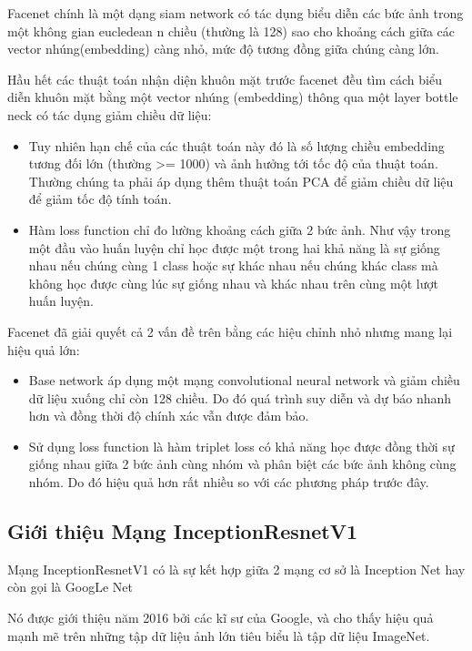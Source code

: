 Facenet chính là một dạng siam network có tác dụng biểu diễn các bức ảnh trong một không
gian eucledean n chiều (thường là 128) sao cho khoảng cách giữa các vector nhúng(embedding)
càng nhỏ, mức độ tương đồng giữa chúng càng lớn.

Hầu hết các thuật toán nhận diện khuôn mặt trước facenet đều tìm cách biểu diễn
khuôn mặt bằng một vector nhúng (embedding) thông qua một layer bottle neck có tác dụng
giảm chiều dữ liệu:

\begin{itemize}
    \item Tuy nhiên hạn chế của các thuật toán này đó là số lượng chiều embedding
          tương đối lớn (thường >= 1000) và ảnh hưởng tới tốc độ của thuật toán.
          Thường chúng ta phải áp dụng thêm thuật toán PCA để giảm chiều dữ liệu để giảm
          tốc độ tính toán.
    \item Hàm loss function chỉ đo lường khoảng cách giữa 2 bức ảnh.
          Như vậy trong một đầu vào huấn luyện chỉ học được một trong hai khả năng
          là sự giống nhau nếu chúng cùng 1 class hoặc sự khác nhau nếu chúng khác
          class mà không học được cùng lúc sự giống nhau và khác nhau trên cùng một
          lượt huấn luyện.
\end{itemize}

Facenet đã giải quyết cả 2 vấn đề trên bằng các hiệu chỉnh nhỏ nhưng mang lại hiệu quả lớn:

\begin{itemize}
    \item Base network áp dụng một mạng convolutional neural network và giảm chiều dữ
          liệu xuống chỉ còn 128 chiều. Do đó quá trình suy diễn và dự báo nhanh hơn và
          đồng thời độ chính xác vẫn được đảm bảo.
    \item Sử dụng loss function là hàm triplet loss có khả năng học được đồng thời
          sự giống nhau giữa 2 bức ảnh cùng nhóm và phân biệt các bức ảnh không cùng nhóm.
          Do đó hiệu quả hơn rất nhiều so với các phương pháp trước đây.
\end{itemize}

\newpage
\subsection{Giới thiệu Mạng InceptionResnetV1}

Mạng InceptionResnetV1 có là sự kết hợp giữa 2 mạng cơ sở là Inception Net hay còn gọi là GoogLe Net

Nó được giới thiệu năm 2016 bởi các kĩ sư của Google, và cho thấy hiệu quả mạnh mẽ trên những tập dữ liệu ảnh lớn
tiêu biểu là tập dữ liệu ImageNet.

